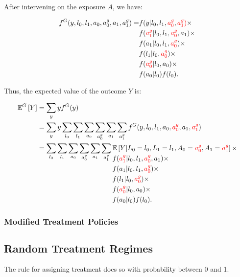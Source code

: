 \documentclass[12pt,twoside]{article}
\begin{document}
After intervening on the exposure $A$, we have:

\begin{align}
    f^G(y,l_0,l_1,a_0,a_0^g,a_1,a_1^g) = &f(y|l_0,l_1,\textcolor{red}{a_0^g},\textcolor{red}{a_1^g)}\times\\
    &f(\textcolor{red}{a_1^g}|l_0,l_1,\textcolor{red}{a_0^g},a_1)\times\\
    &f(a_1|l_0,l_1,\textcolor{red}{a_0^g})\times\\
    &f(l_1|l_0,\textcolor{red}{a_0^g})\times\\
    &f(\textcolor{red}{a_0^g}|l_0,a_0)\times\\
    &f(a_0|l_0) f(l_0).
\end{align}

Thus, the expected value of the outcome $Y$ is:

\begin{align}
    \mathbb{E}^G \left[ Y \right] &= \sum_y y f^G(y) \\
    &= \sum_y y \sum_{l_0} \sum_{l_1} \sum_{a_0} \sum_{a_0^g} \sum_{a_1} \sum_{a_1^g} f^G(y,l_0,l_1,a_0,\textcolor{red}{a_0^g},a_1,\textcolor{red}{a_1^g}) \\
    &= \sum_{l_0} \sum_{l_1} \sum_{a_0} \sum_{a_0^g} \sum_{a_1} \sum_{a_1^g}
    \!\begin{aligned}[t]
        &\mathbb{E} \left[ Y|L_0=l_0,L_1=l_1,A_0=\textcolor{red}{a_0^g},A_1=\textcolor{red}{a_1^g} \right]\times\\
        &f(\textcolor{red}{a_1^g}|l_0,l_1,\textcolor{red}{a_0^g},a_1)\times\\
        &f(a_1|l_0,l_1,\textcolor{red}{a_0^g})\times\\
        &f(l_1|l_0,\textcolor{red}{a_0^g})\times\\
        &f(\textcolor{red}{a_0^g}|l_0,a_0)\times\\
        &f(a_0|l_0) f(l_0).
    \end{aligned}
\end{align}

\subsubsection{Modified Treatment Policies}

\subsection{Random Treatment Regimes}
The rule for assigning treatment does so with probability between 0 and 1.
\end{document}
